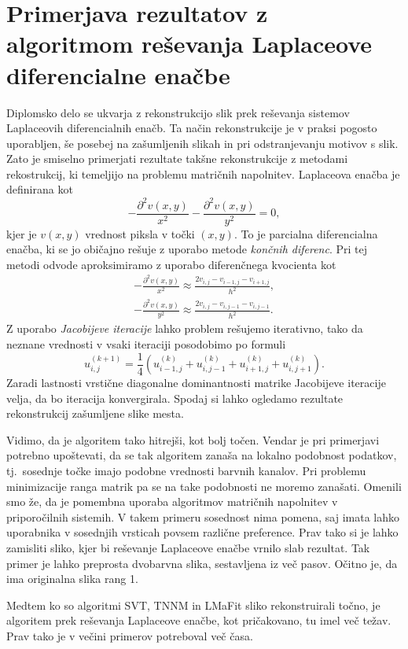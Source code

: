 \section{Primerjava rezultatov z algoritmom re\-še\-van\-ja Laplaceove diferencialne enačbe} \label{1307-2255}
Diplomsko delo \cite{ERZAR_2023} se ukvarja z rekonstrukcijo slik prek reševanja sistemov Laplaceovih diferencialnih enačb.
Ta način rekonstrukcije je v praksi pogosto uporabljen, še posebej na zašumljenih slikah in pri odstranjevanju motivov s slik. Zato je smiselno primerjati rezultate takšne rekonstrukcije z metodami rekostrukcij, ki temeljijo na problemu matričnih napolnitev.  Laplaceova enačba je definirana kot
\[
    -\frac{\partial^2v(x, y)}{x^2} - \frac{\partial^2v(x, y)}{y^2} = 0,
\]
kjer je $v(x,y)$ vrednost piksla v točki $(x, y)$. To je parcialna diferencialna enačba, ki se jo običajno rešuje z uporabo metode \textit{končnih diferenc}. Pri tej metodi odvode aproksimiramo z uporabo diferenčnega kvocienta kot
\begin{align*}
    -\frac{\partial^2v(x, y)}{x^2} \approx \frac{2v_{i,j} - v_{i-1, j} - v_{i+1, j}}{h^2}, \\
    -\frac{\partial^2v(x, y)}{y^2} \approx \frac{2v_{i,j} - v_{i, j-1} - v_{i, j-1}}{h^2}.
\end{align*}
Z uporabo \textit{Jacobijeve iteracije} \cite[pogl. 6]{demmel97} lahko problem rešujemo iterativno, tako da neznane vrednosti v vsaki iteraciji posodobimo po formuli
\[
    u_{i, j}^{(k+1)} = \frac{1}{4}(u_{i - 1, j}^{(k)} +  u_{i, j - 1}^{(k)} + u_{i + 1, j}^{(k)} + u_{i, j + 1}^{(k)}).
\]
Zaradi lastnosti vrstične diagonalne dominantnosti matrike Jacobijeve iteracije velja, da bo iteracija konvergirala. Spodaj si lahko ogledamo rezultate rekonstrukcij zašumljene slike mesta.

\FloatBarrier
Vidimo, da je algoritem tako hitrejši, kot bolj točen. Vendar je pri primerjavi potrebno upoštevati, da se tak algoritem zanaša na lokalno podobnost podatkov, tj.\ sosednje točke imajo podobne vrednosti barvnih kanalov. Pri problemu minimizacije ranga matrik pa se na take podobnosti ne moremo zanašati. Omenili smo že, da je pomembna uporaba algoritmov matričnih napolnitev v priporočilnih sistemih. V takem primeru sosednost nima pomena, saj imata lahko uporabnika v sosednjih vrsticah povsem različne preference. Prav tako si je lahko zamisliti sliko, kjer bi reševanje Laplaceove enačbe vrnilo slab rezultat. Tak primer je lahko preprosta dvobarvna slika, sestavljena iz več pasov. Očitno je, da ima originalna slika rang 1.

Medtem ko so algoritmi SVT, TNNM in LMaFit sliko rekonstruirali točno, je algoritem prek reševanja Laplaceove enačbe, kot pričakovano, tu imel več težav. Prav tako je v večini primerov potreboval več časa.

